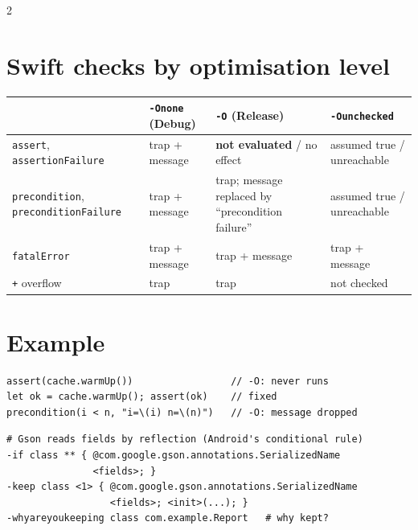\documentclass[8pt]{extarticle}
\newcommand\ct[1]{\texttt{#1}}
\begin{document}
\begin{multicols}{2}
\section{Swift checks by optimisation level}
{\footnotesize\setlength{\tabcolsep}{2.5pt}
\begin{tabular}{@{}>{\raggedright\arraybackslash}p{22mm}>{\raggedright\arraybackslash}p{15mm}>{\raggedright\arraybackslash}p{21mm}>{\raggedright\arraybackslash}p{16mm}@{}}
\toprule
 & \textbf{\ct{-Onone}} (Debug) & \textbf{\ct{-O}} (Release) & \textbf{\ct{-Ounchecked}}\\ \midrule
\ct{assert}, \ct{assertionFailure} & trap + message & \textbf{not evaluated} / no effect & assumed true / unreachable\\
\ct{precondition}, \ct{preconditionFailure} & trap + message & trap; message replaced by ``precondition failure'' & assumed true / unreachable\\
\ct{fatalError} & trap + message & trap + message & trap + message\\
\ct{+} overflow & trap & trap & not checked\\
\bottomrule
\end{tabular}}

\section{Example}
\begin{lstlisting}[language=SwiftSheet]
assert(cache.warmUp())                 // -O: never runs
let ok = cache.warmUp(); assert(ok)    // fixed
precondition(i < n, "i=\(i) n=\(n)")   // -O: message dropped
\end{lstlisting}
\begin{lstlisting}[language=KeepSheet]
# Gson reads fields by reflection (Android's conditional rule)
-if class ** { @com.google.gson.annotations.SerializedName
               <fields>; }
-keep class <1> { @com.google.gson.annotations.SerializedName
                  <fields>; <init>(...); }
-whyareyoukeeping class com.example.Report   # why kept?
\end{lstlisting}

\columnbreak


\end{multicols}
\end{document}
